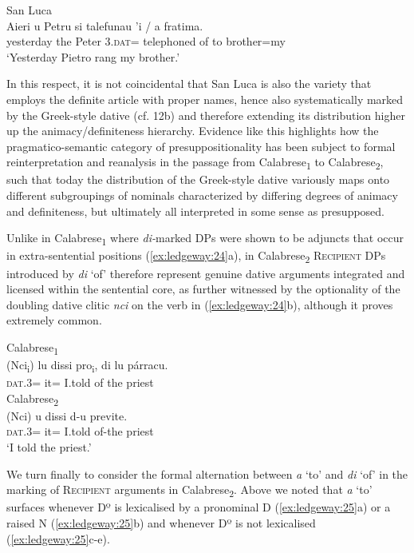 \documentclass[output=paper,modfonts,nonflat]{langsci/langscibook}
\begin{document}
\ea\label{ex:ledgeway:23}
  San Luca\\
\gll Aieri  u  Petru  si  talefunau  ’i  /  a  fratima.\\
  yesterday  the  Peter  3.\textsc{dat}=  telephoned  of    to brother=my\\
    \glt `Yesterday Pietro rang my brother.'
    \z 

In this respect, it is not coincidental that San Luca is also the variety that employs the definite article with proper names, hence also systematically marked by the Greek-style dative (cf. 12b) and therefore extending its distribution higher up the animacy/definiteness hierarchy. Evidence like this highlights how the pragmatico-semantic category of presuppositionality has been subject to formal reinterpretation and reanalysis in the passage from Calabrese\textsubscript{1} to Calabrese\textsubscript{2}, such that today the distribution of the Greek-style dative variously maps onto different subgroupings of nominals characterized by differing degrees of animacy and definiteness, but ultimately all interpreted in some sense as presupposed.

Unlike in Calabrese\textsubscript{1} where \textit{di-}marked DPs were shown to be adjuncts that occur in extra-sentential positions (\ref{ex:ledgeway:24}a), in Calabrese\textsubscript{2} \textsc{Recipient} DPs introduced by \textit{di} ‘of’ therefore represent genuine dative arguments integrated and licensed within the sentential core, as further witnessed by the optionality of the doubling dative clitic \textit{nci} on the verb in (\ref{ex:ledgeway:24}b), although it proves extremely common.

\ea\label{ex:ledgeway:24}
\ea  Calabrese\textsubscript{1}\\
	\gll (Nci\textsubscript{i})  lu  dissi  pro\textsubscript{i},  di  lu  párracu.\\
       \textsc{dat}.3=  it=  I.told    of  the  priest\\

\ex Calabrese\textsubscript{2}\\
    \gll (Nci)  u  dissi  d-u  previte.\\
    \textsc{dat}.3=  it=  I.told  of-the  priest\\
    \glt `I told the priest.'
    \z
    \z

We turn finally to consider the formal alternation between \textit{a} ‘to’ and \textit{di} ‘of’ in the marking of \textsc{Recipient} arguments in Calabrese\textsubscript{2}. Above we noted that \textit{a} ‘to’ surfaces whenever Dº is lexicalised by a pronominal D (\ref{ex:ledgeway:25}a) or a raised N (\ref{ex:ledgeway:25}b) and whenever Dº is not lexicalised (\ref{ex:ledgeway:25}c-e).
\end{document}
